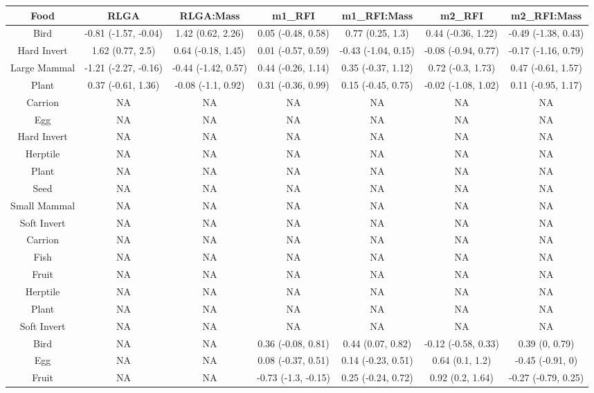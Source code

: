 \begin{table}
\centering\begingroup\fontsize{10}{12}\selectfont

\begin{tabular}[t]{c|c|c|c|c|c|c}
\hline
Food & RLGA & RLGA:Mass & m1_RFI & m1_RFI:Mass & m2_RFI & m2_RFI:Mass\\
\hline
Bird & -0.81 (-1.57, -0.04) & 1.42 (0.62, 2.26) & 0.05 (-0.48, 0.58) & 0.77 (0.25, 1.3) & 0.44 (-0.36, 1.22) & -0.49 (-1.38, 0.43)\\
\hline
Hard Invert & 1.62 (0.77, 2.5) & 0.64 (-0.18, 1.45) & 0.01 (-0.57, 0.59) & -0.43 (-1.04, 0.15) & -0.08 (-0.94, 0.77) & -0.17 (-1.16, 0.79)\\
\hline
Large Mammal & -1.21 (-2.27, -0.16) & -0.44 (-1.42, 0.57) & 0.44 (-0.26, 1.14) & 0.35 (-0.37, 1.12) & 0.72 (-0.3, 1.73) & 0.47 (-0.61, 1.57)\\
\hline
Plant & 0.37 (-0.61, 1.36) & -0.08 (-1.1, 0.92) & 0.31 (-0.36, 0.99) & 0.15 (-0.45, 0.75) & -0.02 (-1.08, 1.02) & 0.11 (-0.95, 1.17)\\
\hline
Carrion & NA & NA & NA & NA & NA & NA\\
\hline
Egg & NA & NA & NA & NA & NA & NA\\
\hline
Hard Invert & NA & NA & NA & NA & NA & NA\\
\hline
Herptile & NA & NA & NA & NA & NA & NA\\
\hline
Plant & NA & NA & NA & NA & NA & NA\\
\hline
Seed & NA & NA & NA & NA & NA & NA\\
\hline
Small Mammal & NA & NA & NA & NA & NA & NA\\
\hline
Soft Invert & NA & NA & NA & NA & NA & NA\\
\hline
Carrion & NA & NA & NA & NA & NA & NA\\
\hline
Fish & NA & NA & NA & NA & NA & NA\\
\hline
Fruit & NA & NA & NA & NA & NA & NA\\
\hline
Herptile & NA & NA & NA & NA & NA & NA\\
\hline
Plant & NA & NA & NA & NA & NA & NA\\
\hline
Soft Invert & NA & NA & NA & NA & NA & NA\\
\hline
Bird & NA & NA & 0.36 (-0.08, 0.81) & 0.44 (0.07, 0.82) & -0.12 (-0.58, 0.33) & 0.39 (0, 0.79)\\
\hline
Egg & NA & NA & 0.08 (-0.37, 0.51) & 0.14 (-0.23, 0.51) & 0.64 (0.1, 1.2) & -0.45 (-0.91, 0)\\
\hline
Fruit & NA & NA & -0.73 (-1.3, -0.15) & 0.25 (-0.24, 0.72) & 0.92 (0.2, 1.64) & -0.27 (-0.79, 0.25)\\

\end{tabular}
\end{table}
